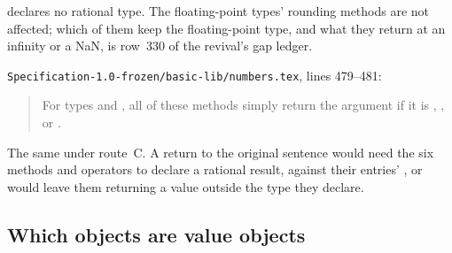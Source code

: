 \begin{description}
declares no rational type.
The floating-point types' rounding methods are not affected; which of them
keep the floating-point type, and what they return at an infinity or a NaN,
is row~330 of the revival's gap ledger.
\item[Original text] \nolinkurl{Specification-1.0-frozen/basic-lib/numbers.tex},
lines 479--481:
\begin{quote}
For types  and ,
all of these methods simply return the argument if it is
\EXP{+\infty}, \EXP{-\infty}, or .
\end{quote}
\item[Route C] The same under route~C.
A return to the original sentence would need the six methods and operators to
declare a rational result, against their entries' , or would
leave them returning a value outside the type they declare.
\end{description}

\subsection{Which objects are value objects}

